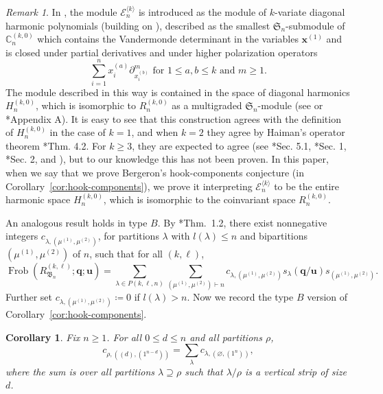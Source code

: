 \documentclass[11pt, reqno]{amsart}
\newtheorem{corollary}[theorem]{Corollary}
\theoremstyle{definition}
\theoremstyle{remark}
\newtheorem{remark}[theorem]{Remark}
\numberwithin{equation}{section}
\newcommand{\0}{\emptyset}
\newcommand{\C}{\mathbb{C}}
\renewcommand{\S}{\mathfrak{S}}
\DeclareMathOperator{\Frob}{Frob}
\begin{document}
\begin{remark}\label{rem:bergeron-modules}
In \cite{BergeronOPAC}, the module $\mathcal{E}_n^{\langle k \rangle}$ is introduced as the module of $k$-variate diagonal harmonic polynomials (building on \cite{Bergeron2013}), described as the smallest $\S_n$-submodule of $\C_n^{(k,0)}$ which contains the Vandermonde determinant in the variables $\bm{x}^{(1)}$ and is closed under partial derivatives and under higher polarization operators 
\begin{equation*}
    \sum_{i=1}^n x_i^{(a)} \partial_{x_i^{(b)}}^{m} \text{ for $1 \leq a,b \leq k$ and $m \geq 1$}.
\end{equation*}
The module described in this way is contained in the space of diagonal harmonics $H_n^{(k,0)}$, which is isomorphic to $R_n^{(k,0)}$ as a multigraded $\S_n$-module (see \cite{Haiman1994} or \cite{JiangLentfer}*{Appendix A}).
It is easy to see that this construction agrees with the definition of $H_n^{(k,0)}$ in the case of $k=1$, and when $k=2$ they agree by Haiman's operator theorem \cite{Haiman2002}*{Thm. 4.2}.
For $k \geq 3$, they are expected to agree (see \cite{Haiman1994}*{Sec. 5.1}, \cite{Haiman2002}*{Sec. 1}, \cite{BergeronPrevilleRatelle}*{Sec. 2}, and \cite{Zabrocki2020}), but to our knowledge this has not been proven.
In this paper, when we say that we prove Bergeron's hook-components conjecture (in Corollary~\ref{cor:hook-components}), we prove it interpreting $\mathcal{E}_n^{\langle k \rangle}$ to be the entire harmonic space $H_n^{(k,0)}$, which is isomorphic to the coinvariant space $R_n^{(k,0)}$.
\end{remark}

An analogous result holds in type $B$.
By \cite{Lentfer-Supersymmetry}*{Thm.~1.2}, there exist nonnegative integers $c_{\lambda,(\mu^{(1)},\mu^{(2)})}$, for partitions $\lambda$ with $l(\lambda) \leq n$ and bipartitions $(\mu^{(1)},\mu^{(2)})$ of $n$, such that for all $(k,\ell)$,
\begin{equation}\label{eq:coefficients-def-B}
    \Frob\left(R_{\mathfrak{B}_n}^{(k,\ell)}; \mathbf{q}; \mathbf{u}\right) = 
    \sum_{\lambda \in P(k,\ell,n)} \sum_{(\mu^{(1)},\mu^{(2)}) \vdash n} 
    c_{\lambda,(\mu^{(1)},\mu^{(2)})} s_\lambda(\mathbf{q}/\mathbf{u}) s_{(\mu^{(1)},\mu^{(2)})}. 
\end{equation}
Further set $c_{\lambda,(\mu^{(1)},\mu^{(2)})} \coloneqq 0$ if $l(\lambda) > n$.
Now we record the type $B$ version of Corollary~\ref{cor:hook-components}.

\begin{corollary}\label{cor:hook-components-B}
    Fix $n \geq 1$. 
    For all $0 \leq d \leq n$ and all partitions $\rho$,
    \begin{equation}\label{eq:hook-components-B}
        c_{\rho,((d),(1^{n-d}))} = \sum_{\lambda} c_{\lambda,(\varnothing,(1^n))},
    \end{equation}
    where the sum is over all partitions $\lambda \supseteq \rho$ such that $\lambda/\rho$ is a vertical strip of size $d$.
\end{corollary}
 
\end{document}
